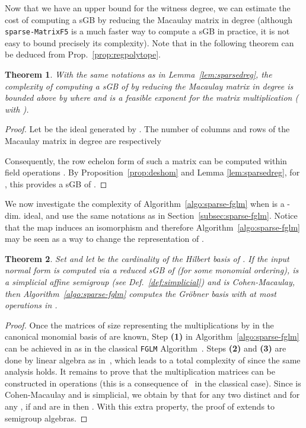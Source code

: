 \documentclass[12pt]{article}
\numberwithin{equation}{section}
\newtheorem{theorem}{Theorem}
\numberwithin{theorem}{section}
\begin{document}
Now that we have an upper bound for the witness degree, we can estimate the cost of computing a sGB by reducing the Macaulay matrix in degree  (although {\tt sparse-MatrixF5} is a much faster way to compute a sGB in practice, it is not easy to bound precisely its complexity). Note that  in the following theorem can be deduced from Prop.~\ref{prop:regpolytope}.

\begin{theorem}\label{theo:complF5}
With the same notations as in Lemma~\ref{lem:sparsedreg}, the
complexity of computing a sGB of 
by reducing the Macaulay matrix in degree  is bounded above by
 where
 and  is a
feasible exponent for the matrix multiplication ( with \cite{williams2012multiplying}).
\end{theorem}


\begin{proof}
Let  be the ideal generated by .  The number of columns and
rows of the Macaulay matrix in degree  are respectively

Consequently, the row echelon form of such a matrix can be computed within  field operations \cite[Prop. 2.11]{storjohann2000algorithms}. By Proposition~\ref{prop:deshom} and Lemma \ref{lem:sparsedreg}, for , this provides a sGB of .
\end{proof}

We now investigate the complexity of Algorithm~\ref{algo:sparse-fglm}
when  is a -dim. ideal, and use the same
notations as in Section~\ref{subsec:sparse-fglm}.  Notice that the map
 induces an isomorphism  and therefore Algorithm~\ref{algo:sparse-fglm}
may be seen as a way to change the representation of .


\begin{theorem}\label{theo:complFGLM}
Set 
 and let  be the cardinality of the Hilbert basis of .
If the input normal form is computed via a reduced sGB of  (for some monomial ordering),  is a simplicial affine semigroup (see Def.~\ref{def:simplicial}) and  is Cohen-Macaulay, then Algorithm~\ref{algo:sparse-fglm} computes the Gr\"obner basis  with at most  operations in .
\end{theorem}
\begin{proof}
Once the  matrices of size  representing the multiplications by  in the canonical monomial basis of  are known, Step {\bf{(1)}} in Algorithm~\ref{algo:sparse-fglm} can be achieved in  as in the classical {\tt FGLM} Algorithm~\cite{FGLM}. Steps {\bf{(2)}} and {\bf{(3)}} are done by linear algebra as in~\cite{FGLM}, which leads to a total complexity of  since the same analysis holds. It remains to prove that the multiplication matrices can be constructed in  operations (this is a consequence of~\cite[Prop.~2.1]{FGLM} in the classical case).  Since  is Cohen-Macaulay and  is simplicial,  we obtain by \cite[Thm.~1.1]{rosales1998cohen} that for any two distinct  and for any , if  and  are in  then . With this extra property, the proof of \cite[Prop.~2.1]{FGLM} extends to semigroup algebras. 
\end{proof}
\end{document}
